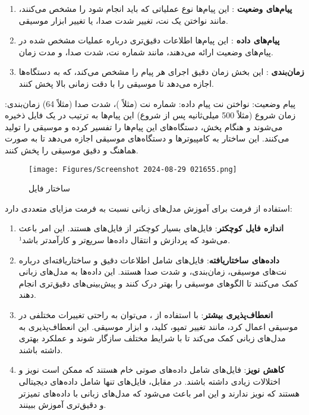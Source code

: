 \begin{enumerate}
  \def\labelenumi{\arabic{enumi}.}
  \item
        \textbf{پیام‌های وضعیت }: این پیام‌ها نوع عملیاتی که
        باید انجام شود را مشخص می‌کنند، مانند نواختن یک نت، تغییر شدت صدا، یا
        تغییر ابزار موسیقی.
  \item
        \textbf{پیام‌های داده }: این پیام‌ها اطلاعات دقیق‌تری
        درباره عملیات مشخص شده در پیام‌های وضعیت ارائه می‌دهند، مانند شماره نت،
        شدت صدا، و مدت زمان.
  \item
        \textbf{زمان‌بندی }: این بخش زمان دقیق اجرای هر پیام را مشخص
        می‌کند، که به دستگاه‌ها اجازه می‌دهد تا موسیقی را با دقت زمانی بالا پخش
        کنند.
\end{enumerate}

پیام وضعیت: نواختن نت 
پیام داده: شماره نت (مثلاً )، شدت صدا (مثلاً 64)
زمان‌بندی: زمان شروع (مثلاً 500 میلی‌ثانیه پس از شروع)
این پیام‌ها به ترتیب در یک فایل  ذخیره می‌شوند و هنگام پخش، دستگاه‌های  این پیام‌ها را تفسیر کرده و موسیقی را تولید می‌کنند. این ساختار به کامپیوترها و دستگاه‌های موسیقی اجازه می‌دهد تا به صورت هماهنگ و دقیق موسیقی را پخش کنند.

\begin{figure}[!htb]
  \centering
  \texttt{[image: Figures/Screenshot 2024-08-29 021655.png]}
  \caption{ساختار فایل 
  }
  \label{Fig:MIDI}
\end{figure}

استفاده از فرمت  برای آموزش مدل‌های زبانی نسبت به فرمت  مزایای
متعددی دارد:

\begin{enumerate}
  \def\labelenumi{\arabic{enumi}.}
  \item
        \textbf{اندازه فایل کوچکتر}: فایل‌های  بسیار کوچکتر از فایل‌های 
        هستند. این امر باعث می‌شود که پردازش و انتقال داده‌ها سریع‌تر و کارآمدتر
        باشد¹.
  \item
        \textbf{داده‌های ساختاریافته}: فایل‌های  شامل اطلاعات دقیق و
        ساختاریافته‌ای درباره نت‌های موسیقی، زمان‌بندی، و شدت صدا هستند. این
        داده‌ها به مدل‌های زبانی کمک می‌کنند تا الگوهای موسیقی را بهتر درک کنند و
        پیش‌بینی‌های دقیق‌تری انجام دهند.
  \item
        \textbf{انعطاف‌پذیری بیشتر}: با استفاده از ، می‌توان به راحتی
        تغییرات مختلفی در موسیقی اعمال کرد، مانند تغییر تمپو، کلید، و ابزار
        موسیقی. این انعطاف‌پذیری به مدل‌های زبانی کمک می‌کند تا با شرایط مختلف
        سازگار شوند و عملکرد بهتری داشته باشند.
  \item
        \textbf{کاهش نویز}: فایل‌های  شامل داده‌های صوتی خام هستند که ممکن
        است نویز و اختلالات زیادی داشته باشند. در مقابل، فایل‌های  تنها
        شامل داده‌های دیجیتالی هستند که نویز ندارند و این امر باعث می‌شود که
        مدل‌های زبانی با داده‌های تمیزتر و دقیق‌تری آموزش ببینند.
\end{enumerate}

